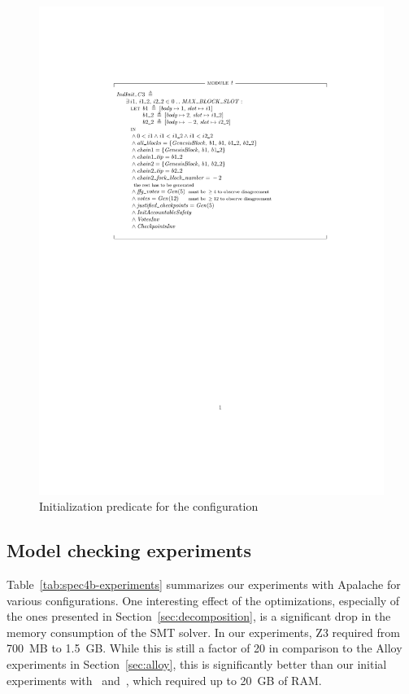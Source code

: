 \begin{figure}
    \includegraphics[width=\textwidth]{images/indinit-c3}
    \caption{Initialization predicate for the
             configuration~}\label{fig:indinit-c3}
\end{figure}

\subsection{Model checking experiments}

Table~\ref{tab:spec4b-experiments} summarizes our experiments with Apalache for
various configurations. One interesting effect of the optimizations,
especially of the ones presented in Section~\ref{sec:decomposition}, is
a significant drop in the memory consumption of the SMT solver. In our
experiments, Z3 required from 700~MB to 1.5~GB\@. While this is still a factor of
20 in comparison to the Alloy experiments in Section~\ref{sec:alloy}, this is
significantly better than our initial experiments with~\SpecTwo{}
and~\SpecThree{}, which required up to 20~GB of RAM\@.


